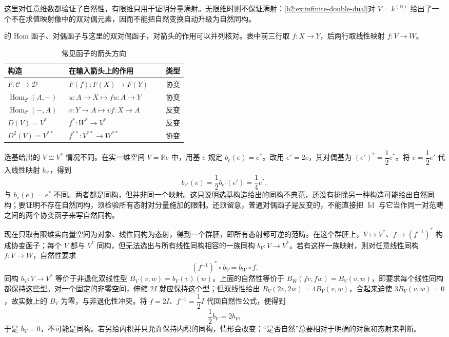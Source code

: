 这里对任意维数都验证了自然性，有限维只用于证明分量满射。无限维时则不保证满射：\cref{b2:ex:infinite-double-dual}对 \(V=k^{(\mathbb N)}\) 给出了一个不在求值映射像中的双对偶元素，因而不能把自然变换自动升级为自然同构。

\ProseParagraphBreak
{}的 Hom 函子、对偶函子与这里的双对偶函子，对箭头的作用可以并列核对。表中前三行取 \(f:X\to Y\)，后两行取线性映射 \(f:V\to W\)。
\begin{table}[htbp]
	\centering
	\caption{常见函子的箭头方向}\label{b2:tab:functor-arrow-directions}
	\begin{tabularx}{\linewidth}{@{}p{0.34\linewidth}X p{0.12\linewidth}@{}}
		\toprule
		构造 & 在输入箭头上的作用 & 类型 \\
		\midrule
		\(F:\mathcal C\to\mathcal D\) & \(F(f):F(X)\to F(Y)\) & 协变 \\
		\(\operatorname{Hom}_{\mathcal C}(A,-)\) & \(u:A\to X\mapsto fu:A\to Y\) & 协变 \\
		\(\operatorname{Hom}_{\mathcal C}(-,A)\) & \(v:Y\to A\mapsto vf:X\to A\) & 反变 \\
		\(D(V)=V^*\) & \(f^*:W^*\to V^*\) & 反变 \\
		\(D^2(V)=V^{**}\) & \(f^{**}:V^{**}\to W^{**}\) & 协变 \\
		\bottomrule
	\end{tabularx}
\end{table}
选基给出的 \(V\cong V^*\) 情况不同。在实一维空间 \(V=\mathbb R e\) 中，用基 \(e\) 规定 \(b_e(e)=e^*\)。改用 \(e'=2e\)，其对偶基为 \((e')^*=\dfrac12e^*\)。将 \(e=\dfrac12e'\) 代入线性映射 \(b_{e'}\)，得到
\[
	b_{e'}(e)=\dfrac12b_{e'}(e')=\dfrac14e^*,
\]
与 \(b_e(e)=e^*\) 不同。两者都是同构，但并非同一个映射。这只说明选基构造给出的同构不典范，还没有排除另一种构造可能给出自然同构；要证明不存在自然同构，须检验所有态射对分量施加的限制。还须留意，普通对偶函子是反变的，不能直接把 \(\operatorname{Id}\) 与它当作同一对范畴之间的两个协变函子来写自然同构。

\ProseParagraphBreak
现在只取有限维实向量空间为对象、线性同构为态射，得到一个群胚，即所有态射都可逆的范畴。在这个群胚上，\(V\mapsto V^*\)、\(f\mapsto(f^{-1})^*\) 构成协变函子；每个 \(V\) 都与 \(V^*\) 同构，但无法选出与所有线性同构相容的一族同构 \(b_V:V\rightarrow V^*\)。若有这样一族映射，则对任意线性同构 \(f:V\to W\)，自然性要求
\[
	(f^{-1})^*\circ b_V=b_W\circ f.
\]
同构 \(b_V:V\to V^*\) 等价于非退化双线性型 \(B_V(v,w)=b_V(v)(w)\)。上面的自然性等价于 \(B_W(fv,fw)=B_V(v,w)\)，即要求每个线性同构都保持这些型。对一个固定的非零空间，伸缩 \(2I\) 就应保持这个型；但双线性给出 \(B_V(2v,2w)=4B_V(v,w)\)，合起来迫使 \(3B_V(v,w)=0\)，故实数上的 \(B_V\) 为零，与非退化性冲突。将 \(f=2I\)、\(f^{-1}=\dfrac12I\) 代回自然性公式，便得到
\[
	\dfrac12 b_V=2b_V,
\]
于是 \(b_V=0\)，不可能是同构。若另给内积并只允许保持内积的同构，情形会改变；“是否自然”总要相对于明确的对象和态射来判断。

